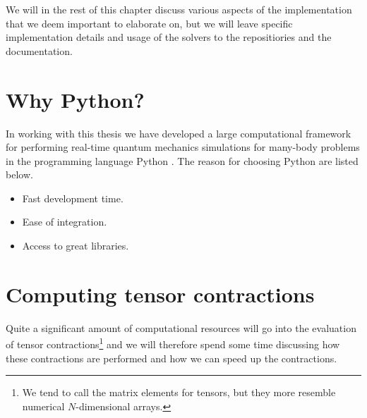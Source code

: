     We will in the rest of this chapter discuss various aspects of the
    implementation that we deem important to elaborate on, but we will leave
    specific implementation details and usage of the solvers to the
    repositiories and the documentation.

    \section{Why Python?}
        In working with this thesis we have developed a large computational
        framework for performing real-time quantum mechanics simulations for
        many-body problems in the programming language Python \cite{python}.
        The reason for choosing Python are listed below.
        \begin{itemize}
            \item Fast development time.
            \item Ease of integration.
            \item Access to great libraries.
        \end{itemize}

    \section{Computing tensor contractions}
        Quite a significant amount of computational resources will go into the
        evaluation of tensor contractions\footnote{%
            We tend to call the matrix elements for tensors, but they more
            resemble numerical $N$-dimensional arrays.%
        } and we will therefore spend some time discussing how these
        contractions are performed and how we can speed up the contractions.


